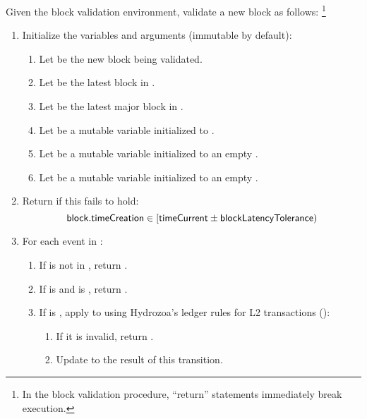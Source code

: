 \documentclass[../hydrozoa.tex]{subfiles}
\begin{document}
Given the block validation environment, validate a new block as follows:%
\footnote{In the block validation procedure, ``return'' statements immediately break execution.}
\begin{enumerate}
  \item Initialize the variables and arguments (immutable by default):
    \begin{enumerate}
      \item Let  be the new block being validated.
      \item Let  be the latest block in .
      \item Let  be the latest major block in .
      \item Let  be a mutable variable initialized to .
      \item Let  be a mutable variable initialized to an empty .
      \item Let  be a mutable variable initialized to an empty .
    \end{enumerate}
  \item Return  if this fails to hold:
    \begin{equation*}
      \mathsf{block.timeCreation} \in [\mathsf{timeCurrent} \pm \mathsf{blockLatencyTolerance})
    \end{equation*}
  \item For each event  in :
    \begin{enumerate}
      \item If  is not in , return .
      \item If  is  and  is , return .
      \item If  is , apply  to  using Hydrozoa's ledger rules for L2 transactions ():
        \begin{enumerate}
          \item If it is invalid, return .
          \item Update  to the result of this transition.
        \end{enumerate}

\end{enumerate}
\end{enumerate}
\end{document}
